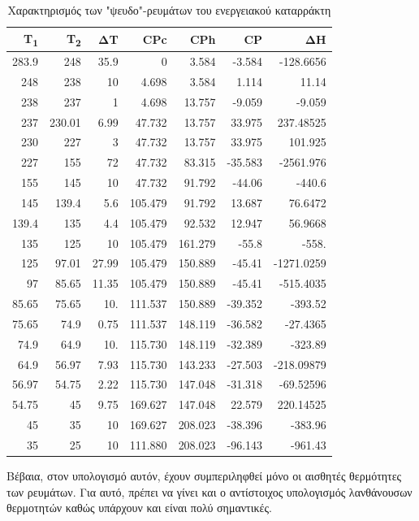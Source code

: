 \documentclass[11pt]{article}
\begin{document}
\begin{table}[htbp]
\caption{Χαρακτηρισμός των "ψευδο"-ρευμάτων του ενεργειακού καταρράκτη}
\centering
\begin{tabular}{rrrrrrr}
Τ\textsubscript{1} & T\textsubscript{2} & ΔΤ & CPc & CPh & CP & ΔΗ\\
\hline
283.9 & 248 & 35.9 & 0 & 3.584 & -3.584 & -128.6656\\
248 & 238 & 10 & 4.698 & 3.584 & 1.114 & 11.14\\
238 & 237 & 1 & 4.698 & 13.757 & -9.059 & -9.059\\
237 & 230.01 & 6.99 & 47.732 & 13.757 & 33.975 & 237.48525\\
230 & 227 & 3 & 47.732 & 13.757 & 33.975 & 101.925\\
227 & 155 & 72 & 47.732 & 83.315 & -35.583 & -2561.976\\
155 & 145 & 10 & 47.732 & 91.792 & -44.06 & -440.6\\
145 & 139.4 & 5.6 & 105.479 & 91.792 & 13.687 & 76.6472\\
139.4 & 135 & 4.4 & 105.479 & 92.532 & 12.947 & 56.9668\\
135 & 125 & 10 & 105.479 & 161.279 & -55.8 & -558.\\
125 & 97.01 & 27.99 & 105.479 & 150.889 & -45.41 & -1271.0259\\
97 & 85.65 & 11.35 & 105.479 & 150.889 & -45.41 & -515.4035\\
85.65 & 75.65 & 10. & 111.537 & 150.889 & -39.352 & -393.52\\
75.65 & 74.9 & 0.75 & 111.537 & 148.119 & -36.582 & -27.4365\\
74.9 & 64.9 & 10. & 115.730 & 148.119 & -32.389 & -323.89\\
64.9 & 56.97 & 7.93 & 115.730 & 143.233 & -27.503 & -218.09879\\
56.97 & 54.75 & 2.22 & 115.730 & 147.048 & -31.318 & -69.52596\\
54.75 & 45 & 9.75 & 169.627 & 147.048 & 22.579 & 220.14525\\
45 & 35 & 10 & 169.627 & 208.023 & -38.396 & -383.96\\
35 & 25 & 10 & 111.880 & 208.023 & -96.143 & -961.43\\
\end{tabular}
\end{table}

Βέβαια, στον υπολογισμό αυτόν, έχουν συμπεριληφθεί μόνο οι αισθητές θερμότητες των ρευμάτων. Για αυτό, πρέπει να γίνει και ο αντίστοιχος υπολογισμός λανθάνουσων θερμοτητών καθώς υπάρχουν και είναι πολύ σημαντικές.
\end{document}
